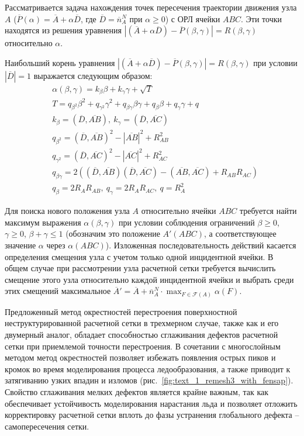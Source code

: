\documentclass[a4paper,14pt]{extarticle}                     %
\theoremstyle{plain}                                         %
\begin{document}
Рассматривается задача нахождения точек пересечения траектории движения узла $A$ ($\overline{P}(\alpha) = \overline{A} + \alpha \overline{D}$, где $\overline{D} = \overline{n}_A^N$ при $\alpha \ge 0$) с ОРЛ ячейки $ABC$.
Эти точки находятся из решения уравнения $|(\overline{A} + \alpha \overline{D}) - \overline{P}(\beta, \gamma)| = R(\beta, \gamma)$ относительно $\alpha$.

Наибольший корень уравнения $|(\overline{A} + \alpha \overline{D}) - \overline{P}(\beta, \gamma)| = R(\beta, \gamma)$ при условии $|\overline{D}| = 1$ выражается следующим образом:
\begin{equation*}
	\begin{aligned}
		& \alpha(\beta, \gamma) = k_{\beta} \beta + k_{\gamma} \gamma + \sqrt{T} \\
		& T = q_{\beta^2} \beta^2 + q_{\gamma^2} \gamma^2 + q_{\beta \gamma} \beta \gamma + q_{\beta} \beta + q_{\gamma} \gamma + q \\
		& k_{\beta} = (\overline{D}, \overline{AB}), \ k_{\gamma} = (\overline{D}, \overline{AC}) \\
		& q_{\beta^2} = (\overline{D}, \overline{AB})^2 - |\overline{AB}|^2 + R_{AB}^2 \\
		& q_{\gamma^2} = (\overline{D}, \overline{AC})^2 - |\overline{AC}|^2 + R_{AC}^2 \\
		& q_{\beta \gamma} = 2 \left( (\overline{D}, \overline{AB}) (\overline{D}, \overline{AC}) - (\overline{AB}, \overline{AC}) + R_{AB}R_{AC} \right) \\
		& q_{\beta} = 2 R_A R_{AB}, \ q_{\gamma} = 2 R_A R_{AC}, \ q = R_A^2
	\end{aligned}
\end{equation*}

Для поиска нового положения узла $A$ относительно ячейки $ABC$ требуется найти максимум выражения $\alpha(\beta, \gamma)$ при условии соблюдения ограничений $\beta \ge 0$, $\gamma \ge 0$, $\beta + \gamma \le 1$ (обозначим это положение $A'(ABC)$, а соответствующее значение $\alpha$ через $\alpha(ABC)$).
Изложенная последовательность действий касается определения смещения узла с учетом только одной инцидентной ячейки.
В общем случае при рассмотрении узла расчетной сетки требуется вычислить смещение этого узла относительно каждой инцидентной ячейки и выбрать среди этих смещений максимальное $\overline{A}' = \overline{A} + \overline{n}_A^N \cdot \max_{F \in \mathscr{F}(A)}{\alpha(F)}$.

Предложенный метод окрестностей перестроения поверхностной неструктурированной расчетной сетки в трехмерном случае, также как и его двумерный аналог, обладает способностью сглаживания дефектов расчетной сетки при приемлемой точности перестроения.
В сочетании с многослойным методом метод окрестностей позволяет избежать появления острых пиков и кромок во время моделирования процесса ледообразования, а также приводит к затягиванию узких впадин и изломов (рис.~\ref{fig:text_1_remesh3_with_fensap}).
Свойство сглаживания мелких дефектов является крайне важным, так как обеспечивает устойчивость моделирования нарастания льда и позволяет отложить корректировку расчетной сетки вплоть до фазы устранения глобального дефекта -- самопересечения сетки.
\end{document}
